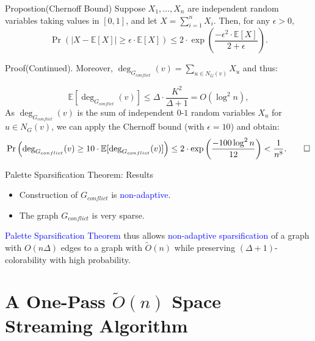 \documentclass[aspectratio=169,xcolor=dvipsnames]{beamer}
\begin{document}
	\begin{frame}
		\begin{alertblock}{Propostion(Chernoff Bound)}
			Suppose $X_1, \dots, X_n$ are independent random variables taking values in $[0, 1]$, and let $X = \sum_{i=1}^{n} X_i$. Then, for any $\epsilon > 0$,
			\[
			\Pr\left( \left| X - \mathbb{E}[X] \right| \geq \epsilon \cdot \mathbb{E}[X] \right) \leq 2 \cdot \exp\left( \frac{-\epsilon^2 \cdot \mathbb{E}[X]}{2 + \epsilon} \right).
			\]
		\end{alertblock}
		
		\begin{block}{Proof(Continued).}
			Moreover, $\deg_{G_{conflict}}(v) = \sum_{u \in N_G(v)} X_u$ and thus:
			
			\[
			\mathbb{E}[\deg_{G_{conflict}}(v)] \leq \Delta \cdot \frac{K^2}{\Delta + 1} = O(\log^2 n),
			\]
			As $\deg_{G_{conflict}}(v)$ is the sum of independent $0$-$1$ random variables $X_u$ for $u \in N_G(v)$, we can apply the Chernoff bound (with $\epsilon = 10$) and obtain:
			\[
			\Pr\left(\deg_{G_{conflict}}(v) \geq 10 \cdot \mathbb{E}[\deg_{G_{conflict}}(v)]\right) \leq 2 \cdot \exp\left( \frac{-100 \log^2 n}{12} \right) < \frac{1}{n^8}.\qed
			\]
		\end{block}
	\end{frame}
	
	\begin{frame}{Palette Sparsification Theorem: Results}
		\begin{itemize}
			\item Construction of \alert{$G_{conflict}$} is \textcolor{blue}{non-adaptive}.
			\item The graph \alert{$G_{conflict}$} is very sparse.
		\end{itemize}
		\begin{alertblock}{}
			\textcolor{blue}{Palette Sparsification Theorem} thus allows \textcolor{blue}{non-adaptive sparsification} of a graph with \alert{$O(n\Delta)$} edges to a graph with \alert{$\tilde{O}(n)$} while preserving \alert{$(\Delta+1)$}-colorability with high probability.
		\end{alertblock}
	\end{frame}
	
	\section{A One-Pass $\tilde{O}(n)$ Space Streaming Algorithm}
	
\end{document}
